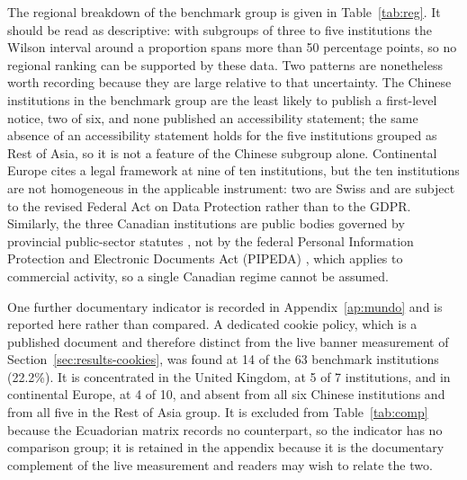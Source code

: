 \documentclass[pdflatex,sn-basic,Numbered,iicol]{sn-jnl}
\theoremstyle{thmstyleone}
\theoremstyle{thmstyletwo}
\theoremstyle{thmstylethree}
\begin{document}
	The regional breakdown of the benchmark group is given in Table~\ref{tab:reg}. It should be read as descriptive: with subgroups of three to five institutions the Wilson interval around a proportion spans more than 50 percentage points, so no regional ranking can be supported by these data. Two patterns are nonetheless worth recording because they are large relative to that uncertainty. The Chinese institutions in the benchmark group are the least likely to publish a first-level notice, two of six, and none published an accessibility statement; the same absence of an accessibility statement holds for the five institutions grouped as Rest of Asia, so it is not a feature of the Chinese subgroup alone. Continental Europe cites a legal framework at nine of ten institutions, but the ten institutions are not homogeneous in the applicable instrument: two are Swiss and are subject to the revised Federal Act on Data Protection \citep{fadp_ch} rather than to the GDPR. Similarly, the three Canadian institutions are public bodies governed by provincial public-sector statutes \citep{fippa_on,fippa_bc,quebec_privacy}, not by the federal Personal Information Protection and Electronic Documents Act (PIPEDA) \citep{pipeda2000}, which applies to commercial activity, so a single Canadian regime cannot be assumed.
	
	One further documentary indicator is recorded in Appendix~\ref{ap:mundo} and is reported here rather than compared. A dedicated cookie policy, which is a published document and therefore distinct from the live banner measurement of Section~\ref{sec:results-cookies}, was found at 14 of the 63 benchmark institutions (22.2\%). It is concentrated in the United Kingdom, at 5 of 7 institutions, and in continental Europe, at 4 of 10, and absent from all six Chinese institutions and from all five in the Rest of Asia group. It is excluded from Table~\ref{tab:comp} because the Ecuadorian matrix records no counterpart, so the indicator has no comparison group; it is retained in the appendix because it is the documentary complement of the live measurement and readers may wish to relate the two.
	
\end{document}
